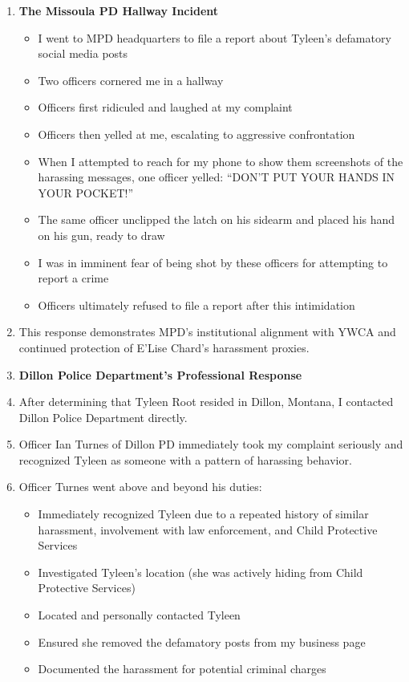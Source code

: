 \documentclass[12pt,letterpaper]{article}
\begin{document}
\begin{enumerate}
\item \textbf{The Missoula PD Hallway Incident}

\begin{itemize}
\item I went to MPD headquarters to file a report about Tyleen's defamatory social media posts
\item Two officers cornered me in a hallway
\item Officers first ridiculed and laughed at my complaint
\item Officers then yelled at me, escalating to aggressive confrontation
\item When I attempted to reach for my phone to show them screenshots of the harassing messages, one officer yelled: ``DON'T PUT YOUR HANDS IN YOUR POCKET!''
\item The same officer unclipped the latch on his sidearm and placed his hand on his gun, ready to draw
\item I was in imminent fear of being shot by these officers for attempting to report a crime
\item Officers ultimately refused to file a report after this intimidation
\end{itemize}

\item This response demonstrates MPD's institutional alignment with YWCA and continued protection of E'Lise Chard's harassment proxies.

\item \textbf{Dillon Police Department's Professional Response}

\item After determining that Tyleen Root resided in Dillon, Montana, I contacted Dillon Police Department directly.

\item Officer Ian Turnes of Dillon PD immediately took my complaint seriously and recognized Tyleen as someone with a pattern of harassing behavior.

\item Officer Turnes went above and beyond his duties:

\begin{itemize}
\item Immediately recognized Tyleen due to a repeated history of similar harassment, involvement with law enforcement, and Child Protective Services
\item Investigated Tyleen's location (she was actively hiding from Child Protective Services)
\item Located and personally contacted Tyleen
\item Ensured she removed the defamatory posts from my business page
\item Documented the harassment for potential criminal charges
\end{itemize}


\end{enumerate}
\end{document}
